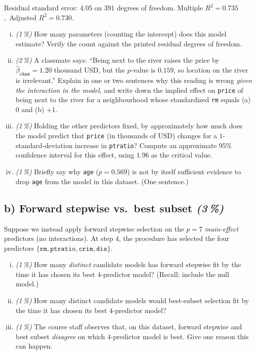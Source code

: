 \documentclass[11pt,a4paper]{article}
\newcommand{\subpoints}[1]{\textit{(#1\,\%)}}
\begin{document}
\noindent Residual standard error: $4.05$ on $391$ degrees of freedom.\quad
Multiple $R^2 = 0.735$,\ Adjusted $R^2 = 0.730$.

\begin{enumerate}[(i)]
  \item \subpoints{1} How many parameters (counting the intercept) does this model estimate? Verify the count against the printed residual degrees of freedom.
  \item \subpoints{2} A classmate says: ``Being next to the river raises the price by $\hat\beta_{\texttt{chas}} = 1.20$ thousand USD, but the $p$-value is $0.159$, so location on the river is irrelevant.'' Explain in one or two sentences why this reading is wrong \emph{given the interaction in the model}, and write down the implied effect on \texttt{price} of being next to the river for a neighbourhood whose standardized \texttt{rm} equals (a) $0$ and (b) $+1$.
  \item \subpoints{1} Holding the other predictors fixed, by approximately how much does the model predict that \texttt{price} (in thousands of USD) changes for a $1$-standard-deviation increase in \texttt{ptratio}? Compute an approximate $95\%$ confidence interval for this effect, using $1.96$ as the critical value.
  \item \subpoints{1} Briefly say why \texttt{age} ($p = 0.569$) is not by itself sufficient evidence to drop \texttt{age} from the model in this dataset. (One sentence.)
\end{enumerate}

\subsection*{b) Forward stepwise vs.\ best subset \subpoints{3}}
Suppose we instead apply forward stepwise selection on the $p = 7$ \emph{main-effect} predictors (no interactions). At step $4$, the procedure has selected the four predictors $\{\texttt{rm}, \texttt{ptratio}, \texttt{crim}, \texttt{dis}\}$.

\begin{enumerate}[(i)]
  \item \subpoints{1} How many \emph{distinct} candidate models has forward stepwise fit by the time it has chosen its best $4$-predictor model? (Recall: include the null model.)
  \item \subpoints{1} How many distinct candidate models would best-subset selection fit by the time it has chosen its best $4$-predictor model?
  \item \subpoints{1} The course staff observes that, on this dataset, forward stepwise and best subset \emph{disagree} on which $4$-predictor model is best. Give one reason this can happen.
\end{enumerate}
\end{document}
